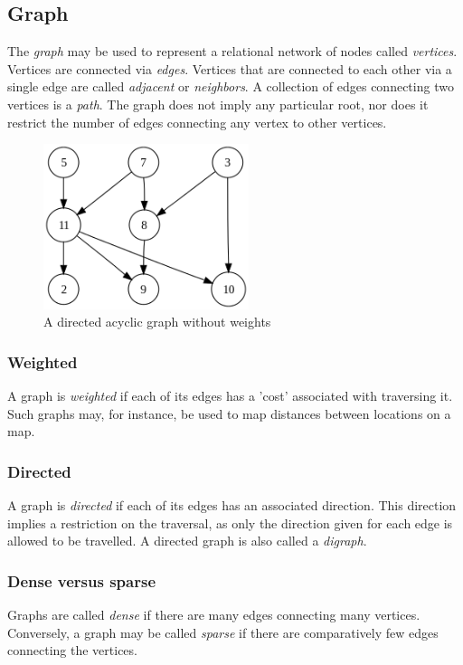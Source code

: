 \documentclass{article}
\begin{document}


\subsection{Graph}
The {\em graph} may be used to represent a relational network of nodes called {\em vertices}.
Vertices are connected via {\em edges}. Vertices that are connected to each other via a single edge are called
{\em adjacent} or {\em neighbors}. A collection of edges connecting two vertices is a {\em path}. The graph does
not imply any particular root, nor does it restrict the number of edges connecting any vertex to other vertices.

\begin{figure}[H]
  \centering
  \includegraphics[width=6cm]{graph_0}
  \caption{A directed acyclic graph without weights}
\end{figure}

\subsubsection{Weighted}
A graph is {\em weighted} if each of its edges has a 'cost' associated with traversing it. Such graphs may,
for instance, be used to map distances between locations on a map.

\subsubsection{Directed}
A graph is {\em directed} if each of its edges has an associated direction. This direction implies a restriction
on the traversal, as only the direction given for each edge is allowed to be travelled. A directed graph is also
called a {\em digraph}.

\subsubsection{Dense versus sparse}
Graphs are called {\em dense} if there are many edges connecting many vertices. Conversely, a graph may be called
{\em sparse} if there are comparatively few edges connecting the vertices.
\end{document}
